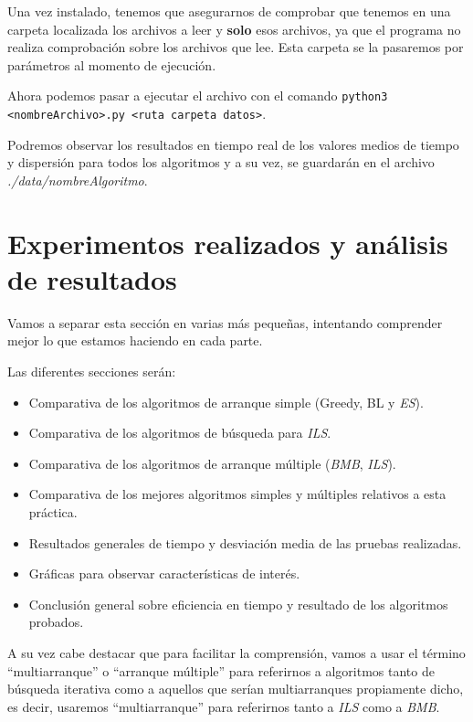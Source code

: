 Una vez instalado, tenemos que asegurarnos de comprobar que tenemos en una carpeta localizada los archivos a leer y \textbf{solo} esos archivos, ya que el programa no realiza comprobación sobre los archivos que lee. Esta carpeta se la pasaremos por parámetros al momento de ejecución.

Ahora podemos pasar a ejecutar el archivo con el comando \texttt{python3 <nombreArchivo>.py <ruta carpeta datos>}.

Podremos observar los resultados en tiempo real de los valores medios de tiempo y dispersión para todos los algoritmos y a su vez, se guardarán en el archivo \textit{./data/nombreAlgoritmo}.

\newpage

\section{Experimentos realizados y análisis de resultados}


Vamos a separar esta sección en varias más pequeñas, intentando comprender mejor lo que estamos haciendo en cada parte.

Las diferentes secciones serán:

\begin{itemize}
\item Comparativa de los algoritmos de arranque simple (Greedy, BL y \textit{ES}).
\item Comparativa de los algoritmos de búsqueda para \textit{ILS}.
\item Comparativa de los algoritmos de arranque múltiple (\textit{BMB}, \textit{ILS}).
\item Comparativa de los mejores algoritmos simples y múltiples relativos a esta práctica.
\item Resultados generales de tiempo y desviación media de las pruebas realizadas.
\item Gráficas para observar características de interés.
\item Conclusión general sobre eficiencia en tiempo y resultado de los algoritmos probados.
\end{itemize}

A su vez cabe destacar que para facilitar la comprensión, vamos a usar el término ``multiarranque'' o ``arranque múltiple'' para referirnos a algoritmos tanto de búsqueda iterativa como a aquellos que serían multiarranques propiamente dicho, es decir, usaremos ``multiarranque'' para referirnos tanto a \textit{ILS} como a \textit{BMB}.

